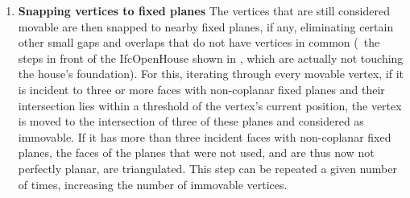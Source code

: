 \begin{enumerate}
\item
\textbf{Snapping vertices to fixed planes}
The vertices that are still considered movable are then snapped to nearby fixed planes, if any, eliminating certain other small gaps and overlaps that do not have vertices in common (\eg\ the steps in front of the IfcOpenHouse shown in , which are actually not touching the house's foundation).
For this, iterating through every movable vertex, if it is incident to three or more faces with non-coplanar fixed planes and their intersection lies within a threshold of the vertex's current position, the vertex is moved to the intersection of three of these planes and considered as immovable.
If it has more than three incident faces with non-coplanar fixed planes, the faces of the planes that were not used, and are thus now not perfectly planar, are triangulated.
This step can be repeated a given number of times, increasing the number of immovable vertices.



\end{enumerate}
